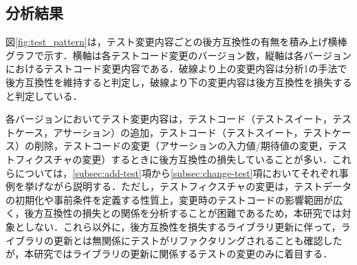 \documentclass[submit]{ipsj}
\begin{document}
\subsection{分析結果}

図\ref{fig:test_pattern}は，テスト変更内容ごとの後方互換性の有無を積み上げ横棒グラフで示す．横軸は各テストコード変更のバージョン数，縦軸は各バージョンにおけるテストコード変更内容である．破線より上の変更内容は分析1の手法で後方互換性を維持すると判定し，破線より下の変更内容は後方互換性を損失すると判定している．

各バージョンにおいてテスト変更内容は，テストコード（テストスイート，テストケース，アサーション）の追加，テストコード（テストスイート，テストケース）の削除，テストコードの変更（アサーションの入力値/期待値の変更，テストフィクスチャの変更）するときに後方互換性の損失していることが多い．これらについては，\ref{subsec:add-test}項から\ref{subsec:change-test}項においてそれぞれ事例を挙げながら説明する．ただし，テストフィクスチャの変更は，テストデータの初期化や事前条件を定義する性質上，変更時のテストコードの影響範囲が広く，後方互換性の損失との関係を分析することが困難であるため，本研究では対象としない．これら以外に，後方互換性を損失するライブラリ更新に伴って，ライブラリの更新とは無関係にテストがリファクタリングされることも確認したが，本研究ではライブラリの更新に関係するテストの変更のみに着目する．

\end{document}
